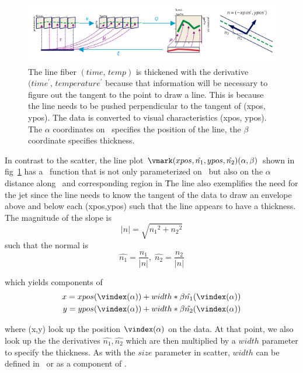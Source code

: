 \documentclass[../main.tex]{subfiles}
\begin{document}
\begin{figure}[H]
    \includegraphics[width=\textwidth]{figures/math/line.png}
    \caption{The line fiber $(time,\, temp)$ is thickened with the derivative $(time^{\prime},\, temperature^{\prime}$ because that information will be necessary to figure out the tangent to the point to draw a line. This is because the line needs to be pushed perpendicular to the tangent of (xpos, ypos). The data is converted to visual characteristics (xpos, ypos). The $\alpha$ coordinates on \gbase\ specifies the position of the line, the $\beta$ coordinate specifies thickness.}
    \label{fig:artist_line}
\end{figure}

In contrast to the scatter, the line plot $\vmark(xpos, \hat{n_{1}}, ypos, \hat{n_{2}})(\alpha, \beta)$ shown in fig~\ref{fig:artist_line} has a \vindex\ function that is not only parameterized on \dbasepoint\ but also on the $\alpha$ distance along \dbasepoint\ and corresponding region in \gbase\. The line also exemplifies the need for the jet since the line needs to know the tangent of the data to draw an envelope above and below each (xpos,ypos) such that the line appears to have a thickness. The magnitude of the slope is 
\begin{equation}
    \lvert n \rvert = \sqrt{{n_{1}}^2 + {n_{2}}^2}
\end{equation}
such that the normal is  
\begin{equation}
    \hat{n_{1}} = \frac{n_1}{\lvert n \rvert}, \; \hat{n_{2}} = \frac{n_2}{\lvert n \rvert}
\end{equation}

which yields components of \gsection\
\begin{align}
 x = xpos(\vindex(\alpha)) &+ width*\beta\hat{n_1}(\vindex(\alpha)) \\
 y = ypos(\vindex(\alpha)) &+ width*\beta\hat{n_2}(\vindex(\alpha)) 
\end{align}

where (x,y) look up the position $\vindex(\alpha)$ on the data. At that point, we also look up the the derivatives $\hat{n_1}, \hat{n_2}$  which are then multiplied by a $width$ parameter to specify the thickness. As with the $size$ parameter in scatter, $width$ can be defined in \vmark\ or as a component of \vtotal. 
\end{document}
